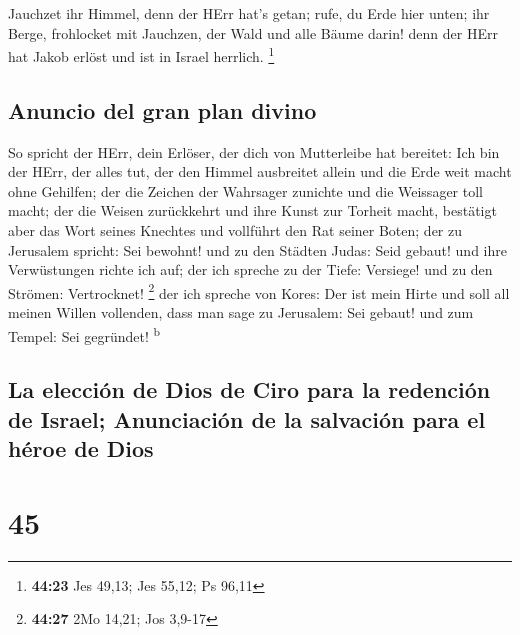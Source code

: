  Jauchzet ihr Himmel, denn der HErr hat's getan; rufe, du
Erde hier unten; ihr Berge, frohlocket mit Jauchzen, der Wald und alle
Bäume darin! denn der HErr hat Jakob erlöst und ist in Israel herrlich.
\footnote{\textbf{44:23} Jes 49,13; Jes 55,12; Ps 96,11}

\hypertarget{anuncio-del-gran-plan-divino}{%
\subsection{Anuncio del gran plan
divino}\label{anuncio-del-gran-plan-divino}}

 So spricht der HErr, dein Erlöser, der dich von
Mutterleibe hat bereitet: Ich bin der HErr, der alles tut, der den
Himmel ausbreitet allein und die Erde weit macht ohne Gehilfen;
 der die Zeichen der Wahrsager zunichte und die Weissager
toll macht; der die Weisen zurückkehrt und ihre Kunst zur Torheit macht,
 bestätigt aber das Wort seines Knechtes und vollführt
den Rat seiner Boten; der zu Jerusalem spricht: Sei bewohnt! und zu den
Städten Judas: Seid gebaut! und ihre Verwüstungen richte ich auf;
 der ich spreche zu der Tiefe: Versiege! und zu den
Strömen: Vertrocknet! \footnote{\textbf{44:27} 2Mo 14,21; Jos 3,9-17}
 der ich spreche von Kores: Der ist mein Hirte und soll
all meinen Willen vollenden, dass man sage zu Jerusalem: Sei gebaut! und
zum Tempel: Sei gegründet! \textsuperscript{b}

\hypertarget{la-elecciuxf3n-de-dios-de-ciro-para-la-redenciuxf3n-de-israel-anunciaciuxf3n-de-la-salvaciuxf3n-para-el-huxe9roe-de-dios}{%
\subsection{La elección de Dios de Ciro para la redención de Israel;
Anunciación de la salvación para el héroe de
Dios}\label{la-elecciuxf3n-de-dios-de-ciro-para-la-redenciuxf3n-de-israel-anunciaciuxf3n-de-la-salvaciuxf3n-para-el-huxe9roe-de-dios}}

\hypertarget{section-44}{%
\section{45}\label{section-44}}

